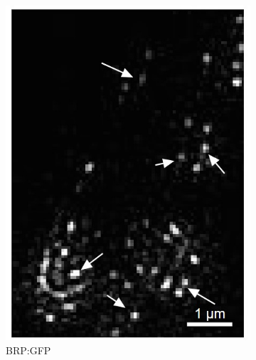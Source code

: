\begin{figure}
\begin{subfigure}[t]{0.24\textwidth}
		\includegraphics[width=\linewidth]{images/DeepSIM_NMJ_AO_ROI1_GFP.jpg}
		\caption{BRP:GFP}
		\label{fig:DeepSIM_NMJ_AO_ROI1_GFP}
	\end{subfigure}
	\begin{subfigure}[t]{0.242\textwidth}
		\centering

\end{subfigure}
\end{figure}
